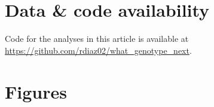 \documentclass[a4paper,10pt]{article}
\newcommand{\idea}[1]{\textcolor{red}{#1}}
\begin{document}
\section{Data \& code availability}

Code for the analyses in this article is available at
\url{https://github.com/rdiaz02/what_genotype_next}.




{\small
  
}





\clearpage

\section{Figures}
\clearpage

\end{document}
